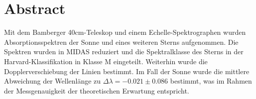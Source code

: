 \section{Abstract}
Mit dem Bamberger 40cm-Teleskop und einem Echelle-Spektrographen wurden Absorptionsspektren der Sonne und eines weiteren Sterns aufgenommen. Die Spektren wurden in MIDAS reduziert und die Spektralklasse des Sterns in der Harvard-Klassifikation in Klasse M eingeteilt. Weiterhin wurde die Dopplerverschiebung der Linien bestimmt. Im Fall der Sonne wurde die mittlere Abweichung der Wellenlänge zu $\Delta\lambda = -0.021 \pm 0.086$ bestimmt, was im Rahmen der Messgenauigkeit der theoretischen Erwartung entspricht.